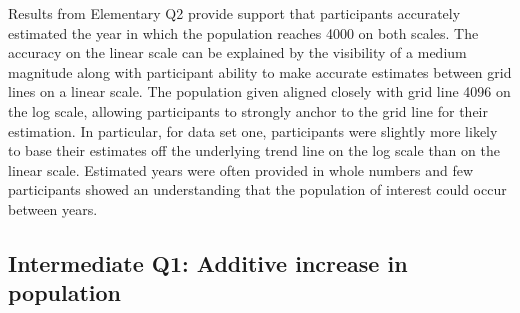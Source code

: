 \documentclass[print]{nuthesis}
\begin{document}
Results from Elementary Q2 provide support that participants accurately estimated the year in which the population reaches 4000 on both scales.
The accuracy on the linear scale can be explained by the visibility of a medium magnitude along with participant ability to make accurate estimates between grid lines on a linear scale.
The population given aligned closely with grid line 4096 on the log scale, allowing participants to strongly anchor to the grid line for their estimation.
In particular, for data set one, participants were slightly more likely to base their estimates off the underlying trend line on the log scale than on the linear scale.
Estimated years were often provided in whole numbers and few participants showed an understanding that the population of interest could occur between years.

\hypertarget{intermediate-q1-additive-increase-in-population}{%
\subsection{Intermediate Q1: Additive increase in population}\label{intermediate-q1-additive-increase-in-population}}
\end{document}
